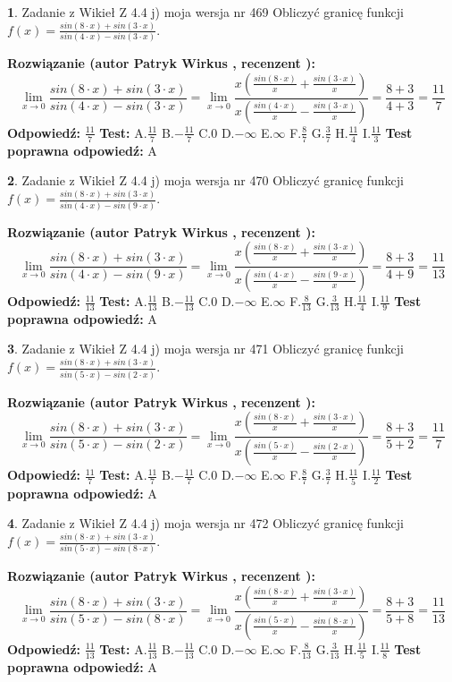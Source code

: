 \documentclass[12pt, a4paper]{article}
\theoremstyle{definition} %
\newtheorem{zad}{}
\newcommand{\zadStart}[1]{\begin{zad}#1\newline}
\newcommand{\zadStop}{\end{zad}}
\newcommand{\rozwStart}[2]{\noindent \textbf{Rozwiązanie (autor #1 , recenzent #2): }\newline}
\newcommand{\rozwStop}{\newline}
\newcommand{\odpStart}{\noindent \textbf{Odpowiedź:}\newline}
\newcommand{\odpStop}{\newline}
\newcommand{\testStart}{\noindent \textbf{Test:}\newline}
\newcommand{\testStop}{\newline}
\newcommand{\kluczStart}{\noindent \textbf{Test poprawna odpowiedź:}\newline}
\newcommand{\kluczStop}{\newline}
\begin{document}
\zadStart{Zadanie z Wikieł Z 4.4 j) moja wersja nr 469}
Obliczyć granicę funkcji $f(x)=\frac{sin(8\cdot x) +sin(3\cdot x)}{sin(4\cdot x) -sin(3\cdot x)}$.
\zadStop
\rozwStart{Patryk Wirkus}{}
$$\lim\limits_{x\to 0}\frac{sin(8\cdot x) +sin(3\cdot x)}{sin(4\cdot x) -sin(3\cdot x)}=\lim\limits_{x\to 0}\frac{x(\frac{sin(8\cdot x)}{x}+\frac{sin(3\cdot x)}{x})}{x(\frac{sin(4\cdot x)}{x}-\frac{sin(3\cdot x)}{x})}=\frac{8+3}{4+3} = \frac{11}{7}$$
\rozwStop
\odpStart
$\frac{11}{7}$
\odpStop
\testStart
A.$\frac{11}{7}$
B.$-\frac{11}{7}$
C.$0$
D.$-\infty$
E.$\infty$
F.$\frac{8}{7}$
G.$\frac{3}{7}$
H.$\frac{11}{4}$
I.$\frac{11}{3}$
\testStop
\kluczStart
A
\kluczStop



\zadStart{Zadanie z Wikieł Z 4.4 j) moja wersja nr 470}
Obliczyć granicę funkcji $f(x)=\frac{sin(8\cdot x) +sin(3\cdot x)}{sin(4\cdot x) -sin(9\cdot x)}$.
\zadStop
\rozwStart{Patryk Wirkus}{}
$$\lim\limits_{x\to 0}\frac{sin(8\cdot x) +sin(3\cdot x)}{sin(4\cdot x) -sin(9\cdot x)}=\lim\limits_{x\to 0}\frac{x(\frac{sin(8\cdot x)}{x}+\frac{sin(3\cdot x)}{x})}{x(\frac{sin(4\cdot x)}{x}-\frac{sin(9\cdot x)}{x})}=\frac{8+3}{4+9} = \frac{11}{13}$$
\rozwStop
\odpStart
$\frac{11}{13}$
\odpStop
\testStart
A.$\frac{11}{13}$
B.$-\frac{11}{13}$
C.$0$
D.$-\infty$
E.$\infty$
F.$\frac{8}{13}$
G.$\frac{3}{13}$
H.$\frac{11}{4}$
I.$\frac{11}{9}$
\testStop
\kluczStart
A
\kluczStop



\zadStart{Zadanie z Wikieł Z 4.4 j) moja wersja nr 471}
Obliczyć granicę funkcji $f(x)=\frac{sin(8\cdot x) +sin(3\cdot x)}{sin(5\cdot x) -sin(2\cdot x)}$.
\zadStop
\rozwStart{Patryk Wirkus}{}
$$\lim\limits_{x\to 0}\frac{sin(8\cdot x) +sin(3\cdot x)}{sin(5\cdot x) -sin(2\cdot x)}=\lim\limits_{x\to 0}\frac{x(\frac{sin(8\cdot x)}{x}+\frac{sin(3\cdot x)}{x})}{x(\frac{sin(5\cdot x)}{x}-\frac{sin(2\cdot x)}{x})}=\frac{8+3}{5+2} = \frac{11}{7}$$
\rozwStop
\odpStart
$\frac{11}{7}$
\odpStop
\testStart
A.$\frac{11}{7}$
B.$-\frac{11}{7}$
C.$0$
D.$-\infty$
E.$\infty$
F.$\frac{8}{7}$
G.$\frac{3}{7}$
H.$\frac{11}{5}$
I.$\frac{11}{2}$
\testStop
\kluczStart
A
\kluczStop



\zadStart{Zadanie z Wikieł Z 4.4 j) moja wersja nr 472}
Obliczyć granicę funkcji $f(x)=\frac{sin(8\cdot x) +sin(3\cdot x)}{sin(5\cdot x) -sin(8\cdot x)}$.
\zadStop
\rozwStart{Patryk Wirkus}{}
$$\lim\limits_{x\to 0}\frac{sin(8\cdot x) +sin(3\cdot x)}{sin(5\cdot x) -sin(8\cdot x)}=\lim\limits_{x\to 0}\frac{x(\frac{sin(8\cdot x)}{x}+\frac{sin(3\cdot x)}{x})}{x(\frac{sin(5\cdot x)}{x}-\frac{sin(8\cdot x)}{x})}=\frac{8+3}{5+8} = \frac{11}{13}$$
\rozwStop
\odpStart
$\frac{11}{13}$
\odpStop
\testStart
A.$\frac{11}{13}$
B.$-\frac{11}{13}$
C.$0$
D.$-\infty$
E.$\infty$
F.$\frac{8}{13}$
G.$\frac{3}{13}$
H.$\frac{11}{5}$
I.$\frac{11}{8}$
\testStop
\kluczStart
A
\kluczStop
\end{document}
